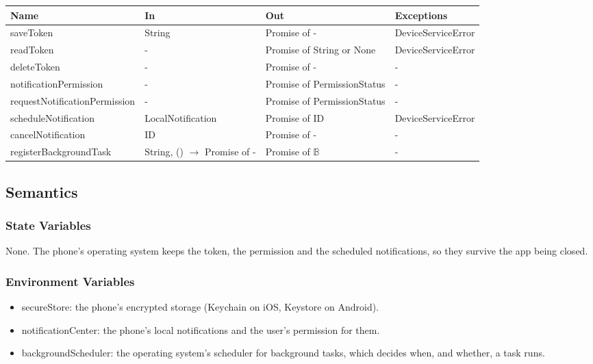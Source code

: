 \documentclass[12pt, titlepage]{article}
\begin{document}
\begin{center}
\small
\setlength{\tabcolsep}{3pt}
\begin{tabular}{>{\raggedright\arraybackslash}p{3.9cm}
  >{\raggedright\arraybackslash}p{3.7cm}
  >{\raggedright\arraybackslash}p{3.4cm}
  >{\raggedright\arraybackslash}p{4.3cm}}
\toprule
\textbf{Name} & \textbf{In} & \textbf{Out} & \textbf{Exceptions} \\
\midrule
saveToken & String & Promise of - & DeviceServiceError \\
readToken & - & Promise of String or None & DeviceServiceError \\
deleteToken & - & Promise of - & - \\
notification\allowbreak Permission & - & Promise of PermissionStatus & - \\
request\allowbreak Notification\allowbreak Permission & - & Promise of PermissionStatus & - \\
scheduleNotification & LocalNotification & Promise of ID & DeviceServiceError \\
cancelNotification & ID & Promise of - & - \\
register\allowbreak Background\allowbreak Task & String, () $\rightarrow$ Promise of - & Promise of
$\mathbb{B}$ & - \\
\bottomrule
\end{tabular}
\end{center}

\subsection{Semantics}

\subsubsection{State Variables}

None. The phone's operating system keeps the token, the permission and the
scheduled notifications, so they survive the app being closed.

\subsubsection{Environment Variables}

\begin{itemize}
\item secureStore: the phone's encrypted storage (Keychain on iOS, Keystore on
  Android).
\item notificationCenter: the phone's local notifications and the user's
  permission for them.
\item backgroundScheduler: the operating system's scheduler for background
  tasks, which decides when, and whether, a task runs.
\end{itemize}
\end{document}
